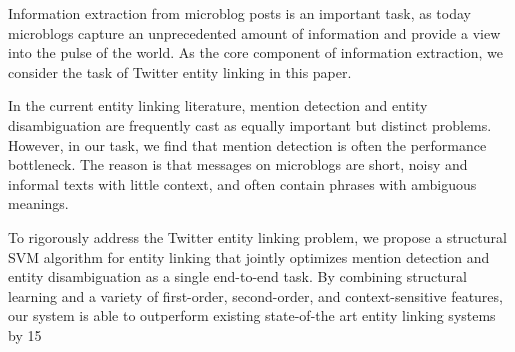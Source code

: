 Information extraction from microblog posts is an important task, as today microblogs capture an unprecedented amount of information and provide a view
 into the pulse of the world. As the core component of information extraction,
 we consider the task of Twitter entity linking in this paper.
 
 In the current entity linking literature, mention detection and entity
 disambiguation are frequently cast as equally important but distinct problems.
 However, in our task, we find that mention detection is often the performance
 bottleneck. The reason is that messages on microblogs are short, noisy and
 informal texts with little context, and often contain phrases with ambiguous
 meanings.
 
 To rigorously address the Twitter entity linking problem, we propose a
 structural SVM algorithm for entity linking that jointly optimizes mention
 detection and entity disambiguation as a single end-to-end task. By combining
 structural learning and a variety of first-order, second-order, and
 context-sensitive features, our system is able to outperform existing
 state-of-the art entity linking systems by 15%


